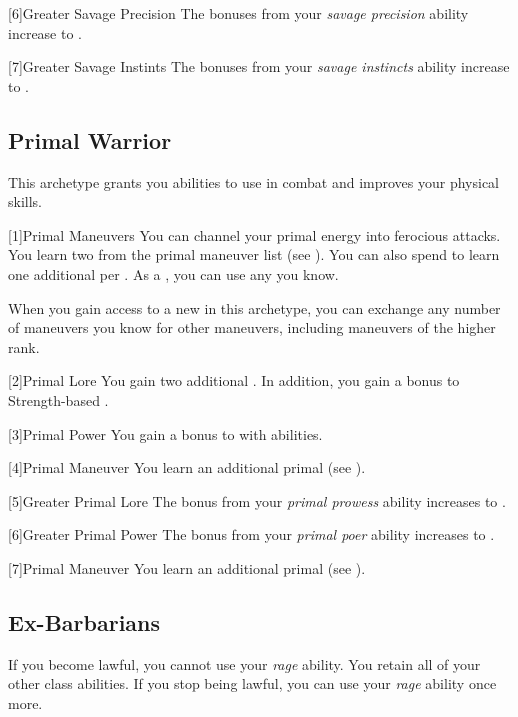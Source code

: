         [6]{Greater Savage Precision} The bonuses from your \textit{savage precision} ability increase to .

        [7]{Greater Savage Instints} The bonuses from your \textit{savage instincts} ability increase to .

    \subsection{Primal Warrior}
        This archetype grants you abilities to use in combat and improves your physical skills.

        [1]{Primal Maneuvers}
        You can channel your primal energy into ferocious attacks.
        You learn two  from the primal maneuver list (see ).
        You can also spend  to learn one additional  per .
        As a , you can use any  you know.

        When you gain access to a new  in this archetype,
            you can exchange any number of maneuvers you know for other maneuvers,
            including maneuvers of the higher rank.

        [2]{Primal Lore} You gain two additional .
        In addition, you gain a  bonus to Strength-based .

        [3]{Primal Power} You gain a  bonus to  with  abilities.

        [4]{Primal Maneuver}
        You learn an additional primal  (see ).

        [5]{Greater Primal Lore} The bonus from your \textit{primal prowess} ability increases to .

        [6]{Greater Primal Power} The bonus from your \textit{primal poer} ability increases to .

        [7]{Primal Maneuver}
        You learn an additional primal  (see ).

    \subsection{Ex-Barbarians}
        If you become lawful, you cannot use your \textit{rage} ability.
        You retain all of your other class abilities.
        If you stop being lawful, you can use your \textit{rage} ability once more.

